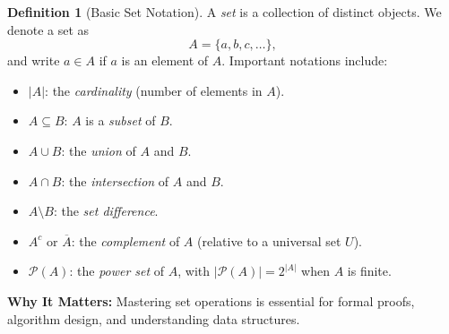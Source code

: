\documentclass[12pt]{article}
\theoremstyle{definition}
\newtheorem{definition}[theorem]{Definition}
\begin{document}
\begin{center}
\end{center}

\begin{definition}[Basic Set Notation]
  A \emph{set} is a collection of distinct objects. We denote a set as
  \[
  A = \{ a, b, c, \dots \},
  \]
  and write \(a \in A\) if \(a\) is an element of \(A\). Important notations include:
  \begin{itemize}[itemsep=3pt]
    \item \(|A|\): the \emph{cardinality} (number of elements in \(A\)).
    \item \(A \subseteq B\): \(A\) is a \emph{subset} of \(B\).
    \item \(A \cup B\): the \emph{union} of \(A\) and \(B\).
    \item \(A \cap B\): the \emph{intersection} of \(A\) and \(B\).
    \item \(A \setminus B\): the \emph{set difference}.
    \item \(A^c\) or \(\overline{A}\): the \emph{complement} of \(A\) (relative to a universal set \(U\)).
    \item \(\mathcal{P}(A)\): the \emph{power set} of \(A\), with \(|\mathcal{P}(A)| = 2^{|A|}\) when \(A\) is finite.
  \end{itemize}
  \vspace{0.5em}
  \textbf{Why It Matters:} Mastering set operations is essential for formal proofs, algorithm design, and understanding data structures.
\end{definition}

\begin{center}
\end{center}
\end{document}

